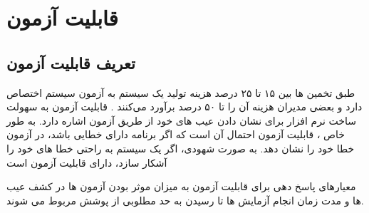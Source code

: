 \chapter{قابلیت آزمون}
\section{تعریف قابلیت آزمون}
طبق تخمین ها بین ۱۵ تا ۲۵ درصد هزینه تولید یک سیستم به آزمون سیستم اختصاص دارد و بعضی مدیران هزینه آن را تا ۵۰ درصد برآورد می‌کنند \cite{test_50}. قابلیت آزمون به سهولت ساخت نرم افزار برای نشان دادن عیب های خود از طریق آزمون اشاره دارد. به طور خاص ، قابلیت آزمون احتمال آن است که اگر برنامه دارای خطایی باشد،‌ در آزمون خطا خود را نشان دهد. به صورت شهودی، اگر یک سیستم به راحتی خطا های خود را آشکار سازد، دارای قابلیت آزمون است

معیارهای پاسخ دهی برای قابلیت آزمون به میزان موثر بودن آزمون ها در کشف عیب ها و مدت زمان انجام آزمایش ها تا رسیدن به حد مطلوبی از پوشش مربوط می شوند.


